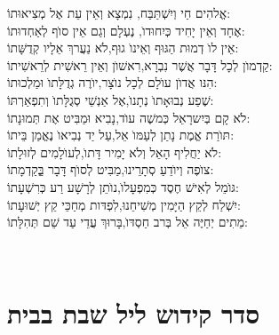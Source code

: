 \documentclass[twoside, openany, parskip=half, 11pt]{book}
\begin{document}
 אֱלהִים חַי וְיִשְׁתַּבַּח, \hfill נִמְצָא וְאֵין עֵת אֶל מְצִיאוּתוֹ: \\
אֶחָד וְאֵין יָחִיד כְּיִחוּדוׂ, \hfill נֶעְלָם וְגַם אֵין סוׂף לְאַחְדוּתוֹ: \\
 אֵין לוׂ דְמוּת הַגּוּף וְאֵינוׂ גוּף,\hfill לׂא נַעֲרךְ אֵלָיו קְדֻשָּׁתוֹ: \\
 קַדְמוׂן לְכָל דָּבָר אֲשֶׁר נִבְרָא,\hfill רִאשׁוׂן וְאֵין רֵאשִׁית לְרֵאשִׁיתוֹ: \\
 הִנּו אֲדוׂן עוׂלָם לְכָל נוׂצָר,\hfill יוׂרֶה גְדֻלָּתוׂ וּמַלְכוּתוֹ: \\
 שֶׁפַע נְבוּאָתוׂ נְתָנוׂ,\hfill אֶל אַנְשֵׁי סְגֻלָּתוׂ וְתִפְאַרְתּוֹ: \\
 לׂא קָם בְּיִשרָאֵל כְּמשֶׁה עוׂד,\hfill נָבִיא וּמַבִּיט אֶת תְּמוּנָתוֹ: \\
 תּוׂרַת אֱמֶת נָתַן לְעַמּוׂ אֵל,\hfill עַל יַד נְבִיאוׂ נֶאֱמַן בֵּיתוֹ: \\
 לׂא יַחֲלִיף הָאֵל וְלׂא יָמִיר דָּתוׂ,\hfill לְעוׂלָמִים לְזוּלָתוֹ: \\
 צוׂפֶה וְיוׂדֵעַ סְתָרֵינוּ,\hfill מַבִּיט לְסוׂף דָּבָר בְְַּקַדְמָתוֹ: \\
 גּוׂמֵל לְאִישׁ חֶסֶד כְּמִפְעָלוׂ,\hfill נוׂתֵן לְרָשָׁע רַע כְּרִשְׁעָתוֹ: \\
 יִשְׁלַח לְקֵץ הַיָּמִין מְשִׁיחֵנוּ,\hfill לִפְדּות מְחַכֵּי קֵץ יְשׁוּעָתוֹ: \\
 מֵתִים יְחַיֶּה אֵל בְּרב חַסְדּוׂ,\hfill בָּרוּךְ עֲדֵי עַד שֵׁם תְּהִלָּתוֹ:\\

\vfill

\quad{}\quad{}\\

\chapter[קידוש ליל שבת]{ סדר קידוש ליל שבת בבית }



\medskip

\newcommand{\birkashabonim}{
\ssubsection{\adforn{18} ברכת הבנים \adforn{17}}

\source{בראשית מח} \begin{tabular}{>{\centering\arraybackslash}m{.4\textwidth} | >{\centering\arraybackslash}m{.4\textwidth}}
\instruction{לבנים} & \instruction{לבנות} \\
יְשִֽׂמְֿךָ֣ אֱלֹהִ֔ים כְּאֶפְרַ֖יִם וְכִמְנַשֶׁ֑ה &
יְשִׂמֵךְ אֱלׂהִים כְּשָׂרָה, רִבְקָה, רָחֵל, וְלֵאָה
 \end{tabular}


יְבָֽרֶכְֿךָ֥
\source{במידבר ו}
 יְיָ֖ וְיִשְׁמְֿרֶֽךָ׃\\
	יָאֵ֨ר יְיָ֧ פָּנָ֛יו אֵלֶ֖יךָ וִֽיחֻנֶּֽךָּ׃\\
 יִשָּׂ֨א יְיָ֤ פָּנָיו֙ אֵלֶ֔יךָ וְיָשֵׂ֥ם לְךָ֖ שָׁלֽוֹם׃


}
\end{document}
